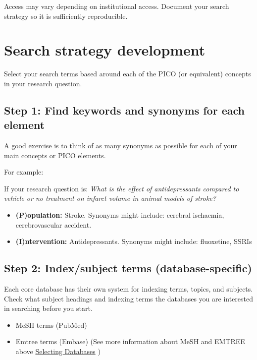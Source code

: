 \documentclass[
]{book}
\providecommand{\tightlist}{%
  \setlength{\itemsep}{0pt}\setlength{\parskip}{0pt}}
\begin{document}
Access may vary depending on institutional access. Document your search strategy so it is sufficiently reproducible.

\hypertarget{search-strategy-development}{%
\section{Search strategy development}\label{search-strategy-development}}

Select your search terms based around each of the PICO (or equivalent) concepts in your research question.

\hypertarget{step-1-find-keywords-and-synonyms-for-each-element}{%
\subsection{Step 1: Find keywords and synonyms for each element}\label{step-1-find-keywords-and-synonyms-for-each-element}}

A good exercise is to think of as many synonyms as possible for each of your main concepts or PICO elements.

For example:

If your research question is: \emph{What is the effect of antidepressants compared to vehicle or no treatment on infarct volume in animal models of stroke?}

\begin{itemize}
\tightlist
\item
  \textbf{(P)opulation:} Stroke. Synonyms might include: cerebral ischaemia, cerebrovascular accident.
\item
  \textbf{(I)ntervention:} Antidepressants. Synonyms might include: fluoxetine, SSRIs
\end{itemize}

\hypertarget{step-2-indexsubject-terms-database-specific}{%
\subsection{Step 2: Index/subject terms (database-specific)}\label{step-2-indexsubject-terms-database-specific}}

Each core database has their own system for indexing terms, topics, and subjects. Check what subject headings and indexing terms the databases you are interested in searching before you start.

\begin{itemize}
\tightlist
\item
  MeSH terms (PubMed)
\item
  Emtree terms (Embase)
  (See more information about MeSH and EMTREE above \protect\hyperlink{Selecting-Databases}{Selecting Databases} )
\end{itemize}
\end{document}
